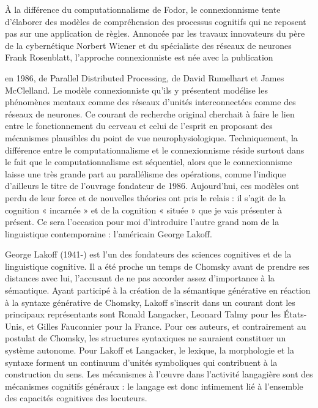  À la différence du computationnalisme de Fodor, le connexionnisme tente d'élaborer des modèles de compréhension des processus cognitifs qui ne reposent pas sur une application de règles. Annoncée par les travaux innovateurs du père de la cybernétique Norbert Wiener et du spécialiste des réseaux de neurones Frank Rosenblatt, l’approche connexionniste est née avec la publication\par


en 1986, de Parallel Distributed Processing, de David Rumelhart et James McClelland. Le modèle connexionniste qu’ils y présentent modélise les phénomènes mentaux comme des réseaux d’unités interconnectées comme des réseaux de neurones. Ce courant de recherche original cherchait à faire le lien entre le fonctionnement du cerveau et celui de l’esprit en proposant des mécanismes plausibles du point de vue neurophysiologique. Techniquement, la différence entre le computationnalisme et le connexionnisme réside surtout dans le fait que le computationnalisme est séquentiel, alors que le connexionnisme laisse une très grande part au parallélisme des opérations, comme l'indique d’ailleurs le titre de l’ouvrage fondateur de 1986. Aujourd’hui, ces modèles ont perdu de leur force et de nouvelles théories ont pris le relais : il s’agit de la cognition « incarnée » et de la cognition « située » que je vais présenter à présent. Ce sera l’occasion pour moi d’introduire l’autre grand nom de la linguistique contemporaine : l'américain George Lakoff.\par


George Lakoff (1941-) est l’un des fondateurs des sciences cognitives et de la linguistique cognitive. Il a été proche un temps de Chomsky avant de prendre ses distances avec lui, l’accusant de ne pas accorder assez d’importance à la sémantique. Ayant participé à la création de la sémantique générative en réaction à la syntaxe générative de Chomsky, Lakoff s’inscrit dans un courant dont les principaux représentants sont Ronald Langacker, Leonard Talmy pour les États-Unis, et Gilles Fauconnier pour la France. Pour ces auteurs, et contrairement au postulat de Chomsky, les structures syntaxiques ne sauraient constituer un système autonome. Pour Lakoff et Langacker, le lexique, la morphologie et la syntaxe forment un continuum d’unités symboliques qui contribuent à la construction du sens. Les mécanismes à l’œuvre dans l’activité langagière sont des mécanismes cognitifs généraux : le langage est donc intimement lié à l’ensemble des capacités cognitives des locuteurs.\par


